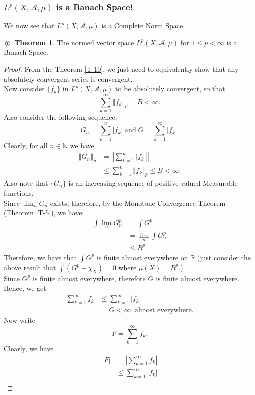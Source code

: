 \documentclass{article}
\theoremstyle{definition}
\newtheorem{theorem}{$\boxed{\boxed{\circledast}}$ Theorem}
\theoremstyle{remark}
\theoremstyle{definition}
\theoremstyle{definition}
\theoremstyle{definition}
\newcommand{\abs}[1]{\left \vert #1\right \vert}
\newcommand{\norm}[1]{\left \Vert #1 \right \Vert}
\newcommand{\R}{\mathbb{R}}
\newcommand{\N}{\mathbb{N}}
\newcommand{\alg}[1]{\mathscr{#1}}
\newcommand{\m}[1]{\mu\left (#1\right )}
\newcommand{\Lp}[1]{L^{p}\left (#1\right )}
\begin{document}
\subsubsection{$ \Lp{X,\alg{A},\mu} $ is a Banach Space!}
We now see that $ \Lp{X,\alg{A},\mu} $ is a Complete Norm Space.
\begin{theorem}
	The normed vector space $ \Lp{X,\alg{A},\mu} $ for $ 1\le p < \infty $ is a Banach Space.
\end{theorem}
\begin{proof}
	From the Theorem \ref{T-10}, we just need to equivalently show that any absolutely convergent series is convergent.\\
	 Now consider $ \{f_k\} $ in $ \Lp{X,\alg{A},\mu} $ to be absolutely convergent, so that
	\[\sum_{k=1}^{\infty}\norm{f_k}_p = B < \infty.\]
	Also consider the following sequence:
	\[G_n = \sum_{k=1}^{n} \abs{f_k}\;\text{and}\; G = \sum_{k=1}^{\infty} \abs{f_k}.\]
	Clearly, for all $ n\in \N $ we have
	\begin{align*}
		\norm{G_n}_p &= \norm{\sum_{k=1}^{n} \abs{f_k}}\\
		&\le \sum_{k=1}^{n}\norm{f_k}_p \le B < \infty.
	\end{align*}
	Also note that $ \{G_n\} $ is an increasing sequence of positive-valued Measurable functions.\\
	Since $ \lim_{n} G_n $ exists, therefore, by the Monotone Convergence Theorem (Theorem \ref{T-5}), we have:
	\begin{align*}
		\int \lim_{n} G_n^{p} &= \int G^{p} \\
		&= \lim_{n}\int G_n^{p} \\
		&\le B^{p}
	\end{align*}
Therefore, we have that $ \int G^{p} $ is finite almost everywhere on $ \R $ (just consider the above result that $ \int \left (G^{p} - \chi_{X}\right ) = 0 $ where $ \m{X} = B^{p}$.)\\
Since $ G^{p} $ is finite almost everywhere, therefore $ G $ is finite almost everywhere. Hence, we get 
\begin{align*}
	\sum_{k=1}^{\infty}{f_k} &\le \sum_{k=1}^{\infty} \abs{f_k}\\
	&= G < \infty\;\;\text{almost everywhere.}
\end{align*}
Now write 
\[F = \sum_{k=1}^{\infty}f_k.\]
Clearly, we have
\begin{align*}
	\abs{F} &= \abs{\sum_{k=1}^{\infty} f_k}\\
	&\le \sum_{k=1}^{\infty} \abs{f_k}\\

\end{align*}
\end{proof}
\end{document}
